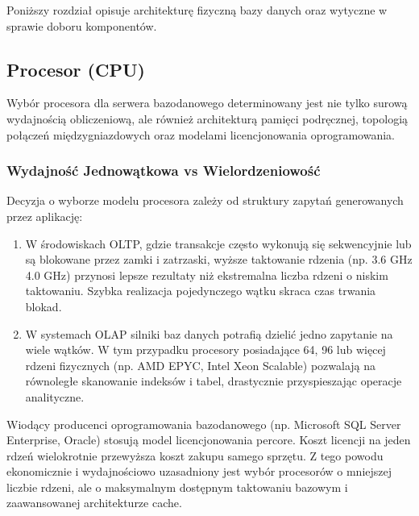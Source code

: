 \documentclass[a4paper,11pt,english,openany,oneside]{sphinxmanual}
\begin{document}
\sphinxAtStartPar
Poniższy rozdział opisuje architekturę fizyczną bazy danych oraz wytyczne w sprawie doboru komponentów.


\subsection{Procesor (CPU)}
\label{\detokenize{rozdzial_2/rozdzial_21/index:procesor-cpu}}
\sphinxAtStartPar
Wybór procesora dla serwera bazodanowego determinowany jest nie tylko surową wydajnością obliczeniową, ale również architekturą pamięci podręcznej, topologią połączeń międzygniazdowych oraz modelami licencjonowania oprogramowania.


\subsubsection{Wydajność Jednowątkowa vs Wielordzeniowość}
\label{\detokenize{rozdzial_2/rozdzial_21/index:wydajnosc-jednowatkowa-vs-wielordzeniowosc}}
\sphinxAtStartPar
Decyzja o wyborze modelu procesora zależy od struktury zapytań generowanych przez aplikację:
\begin{enumerate}
%
\item {} 
\sphinxAtStartPar
{} W środowiskach OLTP, gdzie transakcje często wykonują się sekwencyjnie lub są blokowane przez zamki i zatrzaski, wyższe taktowanie rdzenia (np. 3.6 GHz \sphinxhyphen{} 4.0 GHz) przynosi lepsze rezultaty niż ekstremalna liczba rdzeni o niskim taktowaniu. Szybka realizacja pojedynczego wątku skraca czas trwania blokad.

\item {} 
\sphinxAtStartPar
{} W systemach OLAP silniki baz danych potrafią dzielić jedno zapytanie na wiele wątków. W tym przypadku procesory posiadające 64, 96 lub więcej rdzeni fizycznych (np. AMD EPYC, Intel Xeon Scalable) pozwalają na równoległe skanowanie indeksów i tabel, drastycznie przyspieszając operacje analityczne.

\end{enumerate}

\sphinxAtStartPar
{} Wiodący producenci oprogramowania bazodanowego (np. Microsoft SQL Server Enterprise, Oracle) stosują model licencjonowania per\sphinxhyphen{}core. Koszt licencji na jeden rdzeń wielokrotnie przewyższa koszt zakupu samego sprzętu. Z tego powodu ekonomicznie i wydajnościowo uzasadniony jest wybór procesorów o mniejszej liczbie rdzeni, ale o maksymalnym dostępnym taktowaniu bazowym i zaawansowanej architekturze cache.
\end{document}
